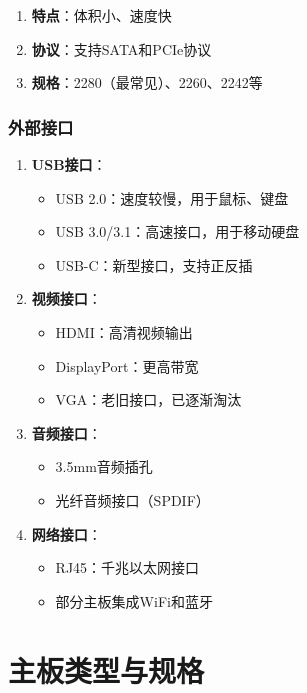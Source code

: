 \documentclass[12pt,UTF8]{ctexbook}
\begin{document}
\begin{enumerate}
    \item \textbf{特点}：体积小、速度快
    \item \textbf{协议}：支持SATA和PCIe协议
    \item \textbf{规格}：2280（最常见）、2260、2242等
\end{enumerate}

\section{外部接口}

\begin{enumerate}
    \item \textbf{USB接口}：
    \begin{itemize}[leftmargin=2em]
        \item USB 2.0：速度较慢，用于鼠标、键盘
        \item USB 3.0/3.1：高速接口，用于移动硬盘
        \item USB-C：新型接口，支持正反插
    \end{itemize}
    
    \item \textbf{视频接口}：
    \begin{itemize}[leftmargin=2em]
        \item HDMI：高清视频输出
        \item DisplayPort：更高带宽
        \item VGA：老旧接口，已逐渐淘汰
    \end{itemize}
    
    \item \textbf{音频接口}：
    \begin{itemize}[leftmargin=2em]
        \item 3.5mm音频插孔
        \item 光纤音频接口（SPDIF）
    \end{itemize}
    
    \item \textbf{网络接口}：
    \begin{itemize}[leftmargin=2em]
        \item RJ45：千兆以太网接口
        \item 部分主板集成WiFi和蓝牙
    \end{itemize}
\end{enumerate}

\part{主板类型与规格}
\end{document}
